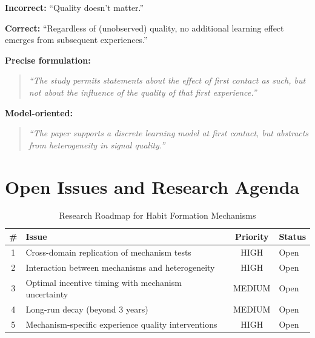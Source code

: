 \begin{tcolorbox}[colback=blue!5!white, colframe=blue!75!black,
    title=Correct Statements About Quality]

\textbf{Incorrect:} ``Quality doesn't matter.''

\textbf{Correct:} ``Regardless of (unobserved) quality, no additional learning effect emerges from subsequent experiences.''

\textbf{Precise formulation:}
\begin{quote}
\textit{``The study permits statements about the effect of first contact as such,
but not about the influence of the quality of that first experience.''}
\end{quote}

\textbf{Model-oriented:}
\begin{quote}
\textit{``The paper supports a discrete learning model at first contact,
but abstracts from heterogeneity in signal quality.''}
\end{quote}

\end{tcolorbox}


\section{Open Issues and Research Agenda}
\label{sec:hf-open}

\begin{table}[htbp]
\centering
\caption{Research Roadmap for Habit Formation Mechanisms}
\label{tab:hf-roadmap}
\renewcommand{\arraystretch}{1.3}
\begin{tabular}{@{}clcl@{}}
\toprule
\textbf{\#} & \textbf{Issue} & \textbf{Priority} & \textbf{Status} \\
\midrule
1 & Cross-domain replication of mechanism tests & HIGH & Open \\
2 & Interaction between mechanisms and heterogeneity & HIGH & Open \\
3 & Optimal incentive timing with mechanism uncertainty & MEDIUM & Open \\
4 & Long-run decay (beyond 3 years) & MEDIUM & Open \\
5 & Mechanism-specific experience quality interventions & HIGH & Open \\
\bottomrule
\end{tabular}
\end{table}

